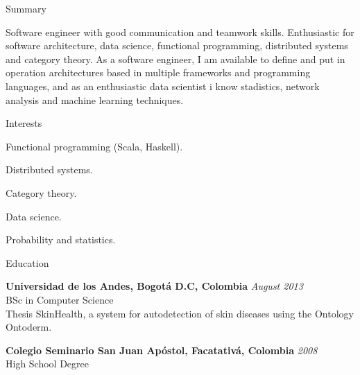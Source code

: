 \documentclass[spanish]{resume}
\begin{document}

\begin{rSection}{Summary}

Software engineer with good communication and teamwork skills. Enthusiastic for software architecture, data science, functional programming, distributed systems and category theory. As a software engineer, I am available to define and put in operation architectures based in multiple frameworks and programming languages, and as an enthusiastic data scientist i know stadistics, network analysis and machine learning techniques.

\end{rSection}

\begin{rSection}{Interests}

\item Functional programming (Scala, Haskell).
\item Distributed systems.
\item Category theory.
\item Data science.
\item Probability and statistics.

\end{rSection}


\begin{rSection}{Education}

{\bf Universidad de los Andes, Bogot\'a D.C, Colombia} \hfill {\em August 2013} \\
BSc in Computer Science \\
Thesis SkinHealth, a system for autodetection of skin diseases using the Ontology Ontoderm.

{\bf Colegio Seminario San Juan Ap\'ostol, Facatativ\'a, Colombia} \hfill {\em 2008} \\
 High School Degree

\end{rSection}
\end{document}
